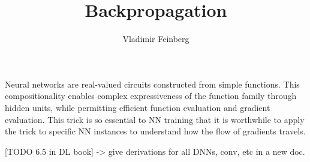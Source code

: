 \documentclass{article}
\title{Backpropagation}
\author{Vladimir Feinberg}
\begin{document}
\maketitle

Neural networks are real-valued circuits constructed from simple functions. This compositionality enables complex expressiveness of the function family through hidden units, while permitting efficient function evaluation and gradient evaluation. This trick is so essential to NN training that it is worthwhile to apply the trick to specific NN instances to understand how the flow of gradients travels.

[TODO 6.5 in DL book] -> give derivations for all DNNs, conv, etc in a new doc.
\end{document}
